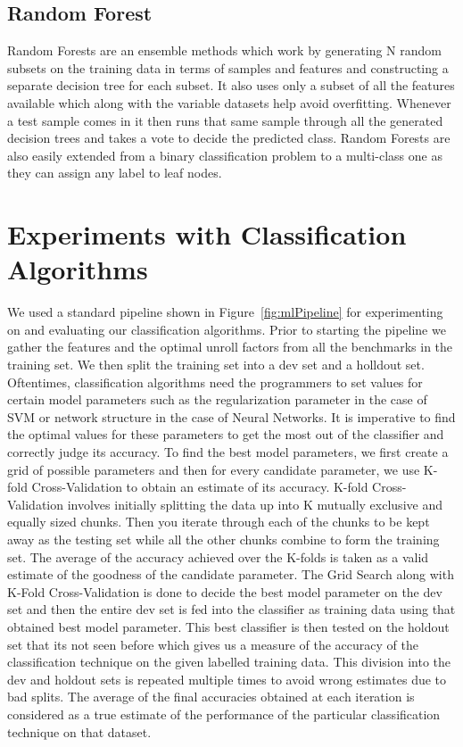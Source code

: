 \documentclass[]{sig-alternate}
\begin{document}
\subsection{Random Forest}
\label{subsec:RandomForest}

Random Forests are an ensemble methods which work by generating N random subsets on the training data in terms of samples and features and constructing a separate decision tree for each subset. It also uses only a subset of all the features available which along with the variable datasets help avoid overfitting. Whenever a test sample comes in it then runs that same sample through all the generated decision trees and takes a vote to decide the predicted class. Random Forests are also easily extended from a binary classification problem to a multi-class one as they can assign any label to leaf nodes. 

\section{Experiments with Classification Algorithms}
\label{sec:ExperimentsClassification}

We used a standard pipeline shown in Figure~\ref{fig:mlPipeline} for experimenting on and evaluating our classification algorithms. Prior to starting the pipeline we gather the features and the optimal unroll factors from all the benchmarks in the training set. We then split the training set into a dev set and a holldout set. Oftentimes, classification algorithms need the programmers to set values for certain model parameters such as the regularization parameter in the case of SVM or network structure in the case of Neural Networks. It is imperative to find the optimal values for these parameters to get the most out of the classifier and correctly judge its accuracy. To find the best model parameters, we first create a grid of possible parameters and then for every candidate parameter, we use K-fold Cross-Validation to obtain an estimate of its accuracy. K-fold Cross-Validation involves initially splitting the data up into K mutually exclusive and equally sized chunks. Then you iterate through each of the chunks to be kept away as the testing set while all the other chunks combine to form the training set. The average of the accuracy achieved over the K-folds is taken as a valid estimate of the goodness of the candidate parameter. The Grid Search along with K-Fold Cross-Validation is done to decide the best model parameter on the dev set and then the entire dev set is fed into the classifier as training data using that obtained best model parameter. This best classifier is then tested on the holdout set that its not seen before which gives us a measure of the accuracy of the classification technique on the given labelled training data. This division into the dev and holdout sets is repeated multiple times to avoid wrong estimates due to bad splits. The average of the final accuracies obtained at each iteration is considered as a true estimate of the performance of the particular classification technique on that dataset. 
\end{document}
